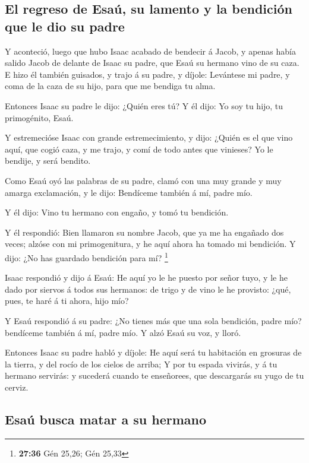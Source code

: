 \hypertarget{el-regreso-de-esauxfa-su-lamento-y-la-bendiciuxf3n-que-le-dio-su-padre}{%
\subsection{El regreso de Esaú, su lamento y la bendición que le dio su
padre}\label{el-regreso-de-esauxfa-su-lamento-y-la-bendiciuxf3n-que-le-dio-su-padre}}

 Y aconteció, luego que hubo Isaac acabado de bendecir á
Jacob, y apenas había salido Jacob de delante de Isaac su padre, que
Esaú su hermano vino de su caza.  E hizo él también
guisados, y trajo á su padre, y díjole: Levántese mi padre, y coma de la
caza de su hijo, para que me bendiga tu alma.

 Entonces Isaac su padre le dijo: ¿Quién eres tú? Y él
dijo: Yo soy tu hijo, tu primogénito, Esaú.

 Y estremecióse Isaac con grande estremecimiento, y dijo:
¿Quién es el que vino aquí, que cogió caza, y me trajo, y comí de todo
antes que vinieses? Yo le bendije, y será bendito.

 Como Esaú oyó las palabras de su padre, clamó con una
muy grande y muy amarga exclamación, y le dijo: Bendíceme también á mí,
padre mío.

 Y él dijo: Vino tu hermano con engaño, y tomó tu
bendición.

 Y él respondió: Bien llamaron su nombre Jacob, que ya me
ha engañado dos veces; alzóse con mi primogenitura, y he aquí ahora ha
tomado mi bendición. Y dijo: ¿No has guardado bendición para mí?
\footnote{\textbf{27:36} Gén 25,26; Gén 25,33}

 Isaac respondió y dijo á Esaú: He aquí yo le he puesto
por señor tuyo, y le he dado por siervos á todos sus hermanos: de trigo
y de vino le he provisto: ¿qué, pues, te haré á ti ahora, hijo mío?

 Y Esaú respondió á su padre: ¿No tienes más que una sola
bendición, padre mío? bendíceme también á mí, padre mío. Y alzó Esaú su
voz, y lloró.

 Entonces Isaac su padre habló y díjole: He aquí será tu
habitación en grosuras de la tierra, y del rocío de los cielos de
arriba;  Y por tu espada vivirás, y á tu hermano
servirás: y sucederá cuando te enseñorees, que descargarás su yugo de tu
cerviz.

\hypertarget{esauxfa-busca-matar-a-su-hermano}{%
\subsection{Esaú busca matar a su
hermano}\label{esauxfa-busca-matar-a-su-hermano}}

